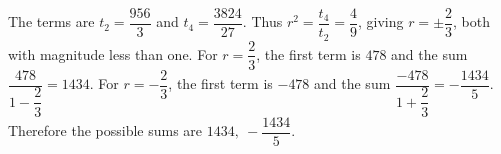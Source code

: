 The terms are $t_2=\dfrac{956}{3}$ and $t_4=\dfrac{3824}{27}$. Thus $r^2=\dfrac{t_4}{t_2}=\dfrac{4}{9}$, giving $r=\pm\dfrac{2}{3}$, both with magnitude less than one. For $r=\dfrac{2}{3}$, the first term is $478$ and the sum $\dfrac{478}{1-\dfrac{2}{3}}=1434$. For $r=-\dfrac{2}{3}$, the first term is $-478$ and the sum $\dfrac{-478}{1+\dfrac{2}{3}}=-\dfrac{1434}{5}$. Therefore the possible sums are $\boxed{1434,\ -\dfrac{1434}{5}}$.
